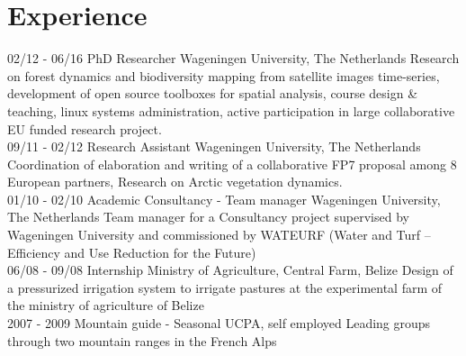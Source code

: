 \documentclass[]{friggeri-cv}
\begin{document}
\section{Experience}
\begin{entrylist}
  \entry
    {02/12 - 06/16}
    {PhD Researcher}
    {Wageningen University, The Netherlands}
    {Research on forest dynamics and biodiversity mapping from satellite images time-series, development of open source toolboxes for spatial analysis, course design \& teaching, linux systems administration, active participation in large collaborative EU funded research project.\\}
  \entry
    {09/11 - 02/12}
    {Research Assistant}
    {Wageningen University, The Netherlands}
    {Coordination of elaboration and writing of a collaborative FP7 proposal among 8 European partners, Research on Arctic vegetation dynamics.\\}
    \entry
    {01/10 - 02/10}
    {Academic Consultancy - Team manager}
    {Wageningen University, The Netherlands}
    {Team manager for a Consultancy project supervised by Wageningen University and commissioned by WATEURF (Water and Turf – Efficiency and Use Reduction for the Future)\\}
    \entry
    {06/08 - 09/08}
    {Internship}
    {Ministry of Agriculture, Central Farm, Belize}
    {Design of a pressurized irrigation system to irrigate pastures at the experimental farm of the ministry of agriculture of Belize\\}
    \entry
    {2007 - 2009}
    {Mountain guide - Seasonal}
    {UCPA, self employed}
    {Leading groups through two mountain ranges in the French Alps}
\end{entrylist}
\end{document}
